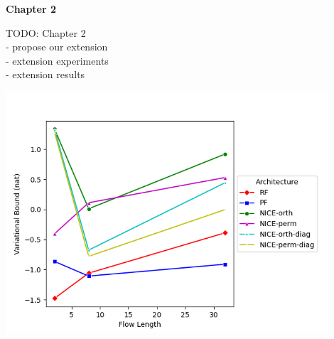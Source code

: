 \begin{center}
	{\Large \bfseries  Chapter 2}
\end{center}

TODO: Chapter 2 \\
- propose our extension \\
- extension experiments \\
- extension results

\includegraphics[width=0.9\textwidth]{u1.png}